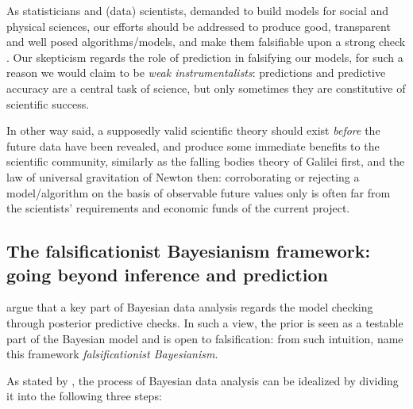 \documentclass{statsoc}
\begin{document}
As statisticians and (data) scientists, demanded to build models for social and physical sciences, our efforts should be addressed to produce good, transparent and well posed algorithms/models, and make them falsifiable upon a strong check \citep{gelman2013philosophy}. Our skepticism regards the role of prediction in falsifying our models, for such a reason we would claim to be \emph{weak instrumentalists}: predictions and predictive accuracy are a central task of science, but only sometimes they are constitutive of scientific success.

In other way said, a supposedly valid scientific theory should exist \emph{before} the future data have been revealed, and produce some immediate benefits to the scientific community, similarly as the falling bodies theory of Galilei first, and the law of universal gravitation of Newton then: corroborating or rejecting a model/algorithm on the basis of observable future values only is often far from the scientists' requirements and economic funds of the current project.

\subsection{The falsificationist Bayesianism framework: going beyond inference and prediction}

\cite{gelman2013philosophy} argue that a key part of Bayesian data analysis regards the model checking through posterior predictive checks. In such a view, the prior is seen as a testable part of the Bayesian model and is open to falsification: from such intuition, \cite{gelman2017beyond} name this framework \emph{falsificationist Bayesianism}.

As stated by \cite{gelman2013bayesian}, the process of Bayesian data analysis can be idealized by dividing it into the following three steps:
\end{document}
